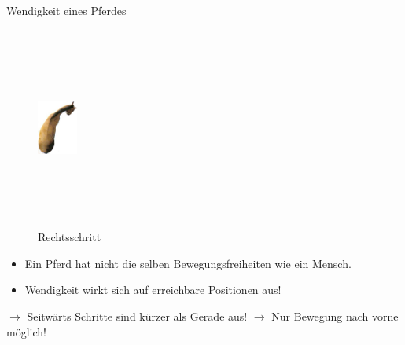 \begin{frame}{Wendigkeit eines Pferdes}
		\begin{minipage}{0.5\textwidth}
			\begin{figure}[H]
				\includegraphics[width=50px, height=250px, keepaspectratio]{appendix/images/horsebend.jpg}		
				\caption{\label{fig:blue_rectangle} Rechtsschritt}
			\end{figure}
		\end{minipage} \hfill
		\begin{minipage}{0.45\textwidth}
			\begin{itemize}
				\item Ein Pferd hat nicht die selben Bewegungsfreiheiten wie ein Mensch.
				\item Wendigkeit wirkt sich auf erreichbare Positionen aus!
			\end{itemize}
			$\rightarrow$ Seitwärts Schritte sind kürzer als Gerade aus! \newline
			$\rightarrow$ Nur Bewegung nach vorne möglich!
		\end{minipage}				
\end{frame}

